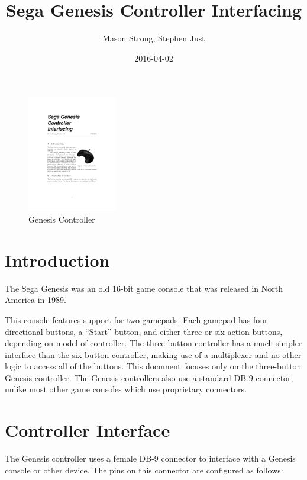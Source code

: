 \documentclass{capstonedoc}
\title{Sega Genesis Controller Interfacing}
\date{2016-04-02}
\author{Mason Strong, Stephen Just}
\begin{document}
\maketitle


\begin{figure}
  \includegraphics[width=0.35\textwidth]{genesis_controller}
  \caption{Genesis Controller}
  \label{fig:controller_photo}
\end{figure}

\section{Introduction}
The Sega Genesis was an old 16-bit game console that was released in North
America in 1989. \cite{SGHistory}

This console features support for two gamepads. Each gamepad has four
directional buttons, a ``Start'' button, and either three or six action
buttons, depending on model of controller. The three-button controller has a
much simpler interface than the six-button controller, making use of a
multiplexer and no other logic to access all of the buttons. This document
focuses only on the three-button Genesis controller. The Genesis controllers
also use a standard DB-9 connector, unlike most other game consoles which
use proprietary connectors.\cite{SGCHwInfo}

\section{Controller Interface}
The Genesis controller uses a female DB-9 connector to interface with a Genesis
console or other device. The pins on this connector are configured as follows:
\end{document}
